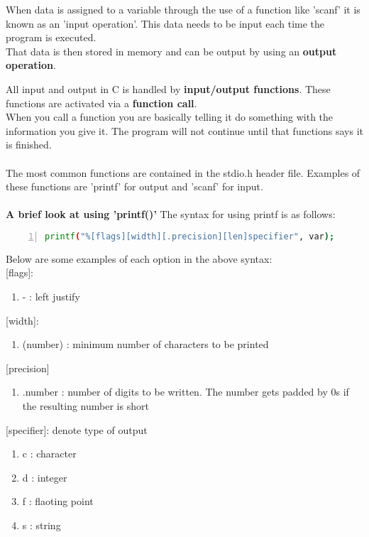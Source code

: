 \documentclass[12pt, letterpaper]{report}
\begin{document}
When data is assigned to a variable through the use of a function like 'scanf' 
it is known as an 'input operation'. This data needs to be input each time the 
program is executed.\\
That data is then stored in memory and can be output by using an \textbf{output operation}.

All input and output in C is handled by \textbf{input/output functions}. These 
functions are activated via a \textbf{function call}. \\
When you call a function you are basically telling it do something with the 
information you give it. The program will not continue until that functions 
says it is finished.\\\\

The most common functions are contained in the stdio.h header file. Examples 
of these functions are 'printf' for output and 'scanf' for input.\\\\

\textbf{A brief look at using 'printf()'}
The syntax for using printf is as follows: 
\begin{lstlisting}[language=Bash,framexleftmargin=5mm,frame=single,xleftmargin=18pt,numbers=left,numberstyle=\tiny]
printf("%[flags][width][.precision][len]specifier", var);
\end{lstlisting}
Below are some examples of each option in the above syntax:\\

[flags]: 
\begin{enumerate}
	\item - : left justify
\end{enumerate}

[width]: 
\begin{enumerate}
	\item (number) : minimum number of characters to be printed
\end{enumerate}

[precision]
\begin{enumerate}
	\item .number : number of digits to be written. The number gets padded by 0s if the resulting number is short
\end{enumerate}

[specifier]: denote type of output
\begin{enumerate}
	\item c : character
	\item d : integer
	\item f : flaoting point
	\item s : string
\end{enumerate}
\end{document}
